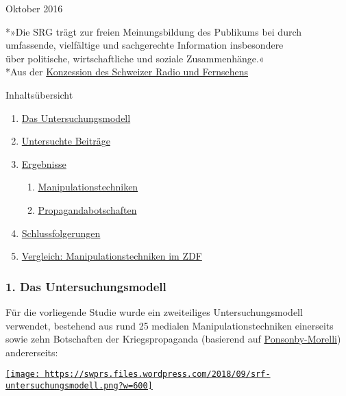 Oktober 2016

*»Die SRG trägt zur freien Meinungsbildung des Publikums bei durch\\
umfassende, vielfältige und sachgerechte Information insbesondere\\
über politische, wirtschaftliche und soziale Zusammenhänge.«\\
*Aus der
\href{https://www.bakom.admin.ch/bakom/de/home/elektronische-medien/informationen-ueber-radio-und-fernsehveranstalter/srg-ssr/konzessionierung-und-technik-srg-ssr.html}{Konzession
des Schweizer Radio und Fernsehens}

Inhaltsübersicht

\begin{enumerate}
\def\labelenumi{\arabic{enumi}.}
\tightlist
\item
  \protect\hyperlink{kapitel1}{Das Untersuchungsmodell}
\item
  \protect\hyperlink{kapitel2}{Untersuchte Beiträge}
\item
  \protect\hyperlink{kapitel3}{Ergebnisse}

  \begin{enumerate}
  \def\labelenumii{\arabic{enumii}.}
  \tightlist
  \item
    \protect\hyperlink{kapitel3-1}{Manipulationstechniken}
  \item
    \protect\hyperlink{kapitel3-2}{Propagandabotschaften}
  \end{enumerate}
\item
  \protect\hyperlink{kapitel4}{Schlussfolgerungen}
\item
  \protect\hyperlink{ZDF}{Vergleich: Manipulationstechniken im ZDF}
\end{enumerate}

\hypertarget{1-das-untersuchungsmodell}{%
\subsubsection{1. Das
Untersuchungsmodell}\label{1-das-untersuchungsmodell}}

Für die vorliegende Studie wurde ein zweiteiliges Untersuchungsmodell
verwendet, bestehend aus rund 25 medialen Manipulationstechniken
einerseits sowie zehn Botschaften der Kriegspropaganda (basierend auf
\href{https://swprs.org/der-propaganda-schluessel/}{Ponsonby-Morelli})
andererseits:

\href{https://swprs.files.wordpress.com/2018/09/propaganda-schluessel-spr.pdf}{\texttt{[image: https://swprs.files.wordpress.com/2018/09/srf-untersuchungsmodell.png?w=600]}}

